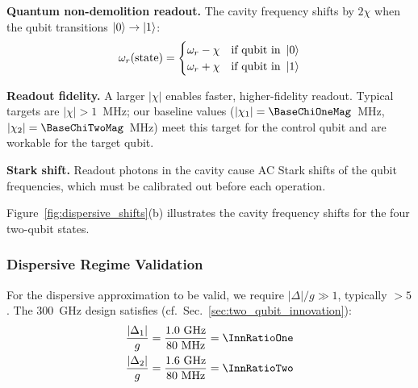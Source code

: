 \textbf{Quantum non-demolition readout.} The cavity frequency shifts by $2\chi$
when the qubit transitions $\ket{0} \to \ket{1}$:
\begin{equation}
\omega_r(\text{state}) = \begin{cases} \omega_r - \chi & \text{if qubit in } \ket{0} \\ \omega_r + \chi & \text{if qubit in } \ket{1} \end{cases}
\end{equation}

\textbf{Readout fidelity.} A larger $|\chi|$ enables faster, higher-fidelity readout.
Typical targets are $|\chi| > 1$~MHz; our baseline values
($|\chi_1| = \BaseChiOneMag$~MHz, $|\chi_2| = \BaseChiTwoMag$~MHz) meet this
target for the control qubit and are workable for the target qubit.

\textbf{Stark shift.} Readout photons in the cavity cause AC Stark shifts of the
qubit frequencies, which must be calibrated out before each operation.

Figure~\ref{fig:dispersive_shifts}(b) illustrates the cavity frequency shifts for the four two-qubit states.



\subsubsection{Dispersive Regime Validation}

For the dispersive approximation to be valid, we require $|\Delta|/g \gg 1$, typically $> 5$. The 300~GHz design satisfies (cf.\ Sec.~\ref{sec:two_qubit_innovation}):
\begin{align}
\frac{|\Delta_1|}{g} &= \frac{1.0 \text{ GHz}}{80 \text{ MHz}} = \InnRatioOne \\
\frac{|\Delta_2|}{g} &= \frac{1.6 \text{ GHz}}{80 \text{ MHz}} = \InnRatioTwo
\end{align}

